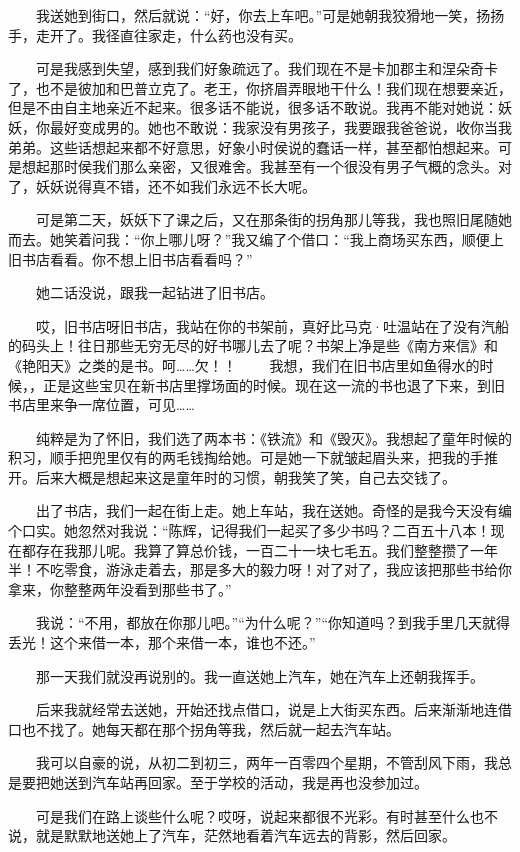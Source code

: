  　　我送她到街口，然后就说：“好，你去上车吧。”可是她朝我狡猾地一笑，扬扬手，走开了。我径直往家走，什么药也没有买。 
 
 　　可是我感到失望，感到我们好象疏远了。我们现在不是卡加郡主和涅朵奇卡了，也不是彼加和巴普立克了。老王，你挤眉弄眼地干什么！我们现在想要亲近，但是不由自主地亲近不起来。很多话不能说，很多话不敢说。我再不能对她说：妖妖，你最好变成男的。她也不敢说：我家没有男孩子，我要跟我爸爸说，收你当我弟弟。这些话想起来都不好意思，好象小时侯说的蠢话一样，甚至都怕想起来。可是想起那时侯我们那么亲密，又很难舍。我甚至有一个很没有男子气概的念头。对了，妖妖说得真不错，还不如我们永远不长大呢。 
 
 　　可是第二天，妖妖下了课之后，又在那条街的拐角那儿等我，我也照旧尾随她而去。她笑着问我：“你上哪儿呀？”我又编了个借口：“我上商场买东西，顺便上旧书店看看。你不想上旧书店看看吗？” 
 
 　　她二话没说，跟我一起钻进了旧书店。 
 
 　　哎，旧书店呀旧书店，我站在你的书架前，真好比马克·吐温站在了没有汽船的码头上！往日那些无穷无尽的好书哪儿去了呢？书架上净是些《南方来信》和《艳阳天》之类的是书。呵……欠！！ 　　我想，我们在旧书店里如鱼得水的时候，，正是这些宝贝在新书店里撑场面的时候。现在这一流的书也退了下来，到旧书店里来争一席位置，可见…… 
 
 　　纯粹是为了怀旧，我们选了两本书：《铁流》和《毁灭》。我想起了童年时候的积习，顺手把兜里仅有的两毛钱掏给她。可是她一下就皱起眉头来，把我的手推开。后来大概是想起来这是童年时的习惯，朝我笑了笑，自己去交钱了。 
 
 　　出了书店，我们一起在街上走。她上车站，我在送她。奇怪的是我今天没有编个口实。她忽然对我说：“陈辉，记得我们一起买了多少书吗？二百五十八本！现在都存在我那儿呢。我算了算总价钱，一百二十一块七毛五。我们整整攒了一年半！不吃零食，游泳走着去，那是多大的毅力呀！对了对了，我应该把那些书给你拿来，你整整两年没看到那些书了。” 
 
 　　我说：“不用，都放在你那儿吧。”“为什么呢？”“你知道吗？到我手里几天就得丢光！这个来借一本，那个来借一本，谁也不还。” 
 
 　　那一天我们就没再说别的。我一直送她上汽车，她在汽车上还朝我挥手。 
 
 　　后来我就经常去送她，开始还找点借口，说是上大街买东西。后来渐渐地连借口也不找了。她每天都在那个拐角等我，然后就一起去汽车站。 
 
 　　我可以自豪的说，从初二到初三，两年一百零四个星期，不管刮风下雨，我总是要把她送到汽车站再回家。至于学校的活动，我是再也没参加过。 
 
 　　可是我们在路上谈些什么呢？哎呀，说起来都很不光彩。有时甚至什么也不说，就是默默地送她上了汽车，茫然地看着汽车远去的背影，然后回家。 
 
